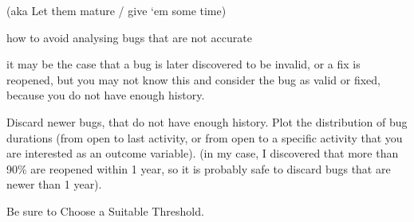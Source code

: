 

(aka Let them mature / give ‘em some time)

\Problem

how to avoid analysing bugs that are not accurate

\Context

it may be the case that a bug is later discovered to be invalid, or a fix is reopened, but you may not know this and consider the bug as valid or fixed, because you do not have enough history.

\Solution

Discard newer bugs, that do not have enough history. Plot the distribution of bug durations (from open to last activity, or from open to a specific activity that you are interested as an outcome variable). (in my case, I discovered that more than 90\% are reopened within 1 year, so it is probably safe to discard bugs that are newer than 1 year).

\RelatedPatterns

Be sure to Choose a Suitable Threshold.